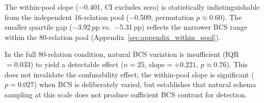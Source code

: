 \documentclass[11pt]{article}
\begin{document}
\begin{table}[h]
\centering
\small
\caption{Three-way BCS--accuracy analysis on FewRel. Slope: OLS of batch accuracy on BCS (bootstrap CIs, $B{=}10{,}000$). $\Delta$: accuracy gap between top- and bottom-quartile BCS batches. See Appendix~\ref{sec:appendix_within_pool} for CI interpretation.}
\label{tab:within_pool}
\end{table}

The within-pool slope ($-$0.401, CI excludes zero) is statistically indistinguishable from the independent 16-relation pool ($-$0.509; permutation $p \approx 0.60$). The smaller quartile gap ($-$3.92\,pp vs.\ $-$5.31\,pp) reflects the narrower BCS range within the 80-relation pool (Appendix~\ref{sec:appendix_within_pool}).

In the full 80-relation condition, natural BCS variation is insufficient (IQR${}=0.033$) to yield a detectable effect ($n=25$, slope${}=+0.221$, $p \approx 0.76$). This does not invalidate the confusability effect; the within-pool slope is significant ($p=0.027$) when BCS is deliberately varied, but establishes that natural schema sampling at this scale does not produce sufficient BCS contrast for detection.
\end{document}
